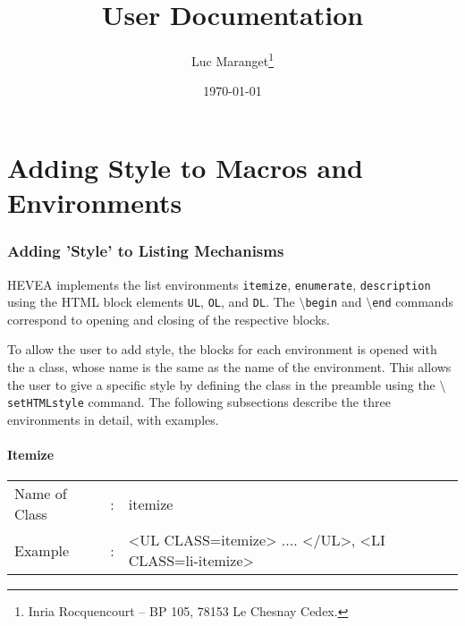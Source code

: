 \documentclass {article}
\title{\hevea{} User Documentation}
\author{Luc Maranget\thanks{Inria Rocquencourt -- BP 105, 78153 Le
Chesnay Cedex. {\tt \mailto{Luc.Maranget@inria.fr}}}}
\date{\today}
\begin{document}
\maketitle

\part{Adding Style to Macros and Environments}

\section {Adding 'Style' to Listing Mechanisms}
HEVEA implements the list environments \texttt{itemize}, \texttt{enumerate}, \texttt{description} using the HTML block elements \texttt{UL}, \texttt{OL}, and \texttt{DL}. The \texttt{$\setminus$begin} and \texttt{$\setminus$end} commands correspond to opening and closing of the respective blocks. 

To allow the user to add style, the blocks for each environment is opened with the a class, whose name is the same as the name of the environment. This allows the user to give a specific style by defining the class in the preamble using the \texttt{$\setminus$setHTMLstyle} command. The following subsections describe the three environments in detail, with examples. 

\subsection{Itemize}
\begin{tabular}{lll}
Name of Class & : & itemize\\
Example & : & <UL CLASS=itemize> .... </UL>, <LI CLASS=li-itemize>\\
\end{tabular}
\end{document}
